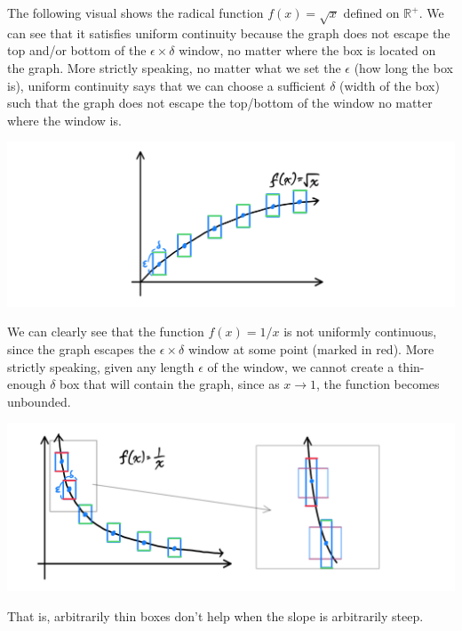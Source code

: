 \documentclass{article}
\begin{document}
\begin{definition}
      The following visual shows the radical function $f(x) = \sqrt{x}$ defined on $\mathbb{R}^+$. We can see that it satisfies uniform continuity because the graph does not escape the top and/or bottom of the $\epsilon \times \delta$ window, no matter where the box is located on the graph. More strictly speaking, no matter what we set the $\epsilon$ (how long the box is), uniform continuity says that we can choose a sufficient $\delta$ (width of the box) such that the graph does not escape the top/bottom of the window no matter where the window is. 
      \begin{center}
          \includegraphics[scale=0.28]{img/Uniform_Continuity_Radical.PNG}
      \end{center}
      We can clearly see that the function $f(x) = 1/x$ is not uniformly continuous, since the graph escapes the $\epsilon \times \delta$ window at some point (marked in red). More strictly speaking, given any length $\epsilon$ of the window, we cannot create a thin-enough $\delta$ box that will contain the graph, since as $x \rightarrow 1$, the function becomes unbounded. 
      \begin{center}
          \includegraphics[scale=0.25]{img/Uniform_Continuity_Rational.PNG}
      \end{center}
      That is, arbitrarily thin boxes don't help when the slope is arbitrarily steep. 
    \end{definition}
\end{document}
